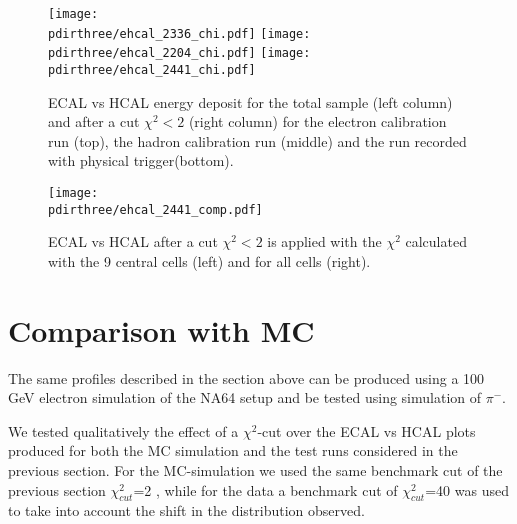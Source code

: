 \newpage
\begin{figure}[h!]
  \begin{center}
    \texttt{[image: \\pdirthree/ehcal\_2336\_chi.pdf]}
    \texttt{[image: \\pdirthree/ehcal\_2204\_chi.pdf]}
    \texttt{[image: \\pdirthree/ehcal\_2441\_chi.pdf]}
  \end{center}
  \caption[ECAL vs HCAL energy deposit after a cut $\chi^2$]{ECAL vs HCAL energy deposit for the total sample (left
    column) and after a cut $\chi^2<2$ (right column) for the
    electron calibration run (top), the hadron calibration run (middle) and the run recorded with physical trigger(bottom).}
  \label{fig:ehcal_test}
\end{figure}
\clearpage

\begin{figure}[h!]
  \begin{center}
    \texttt{[image: \\pdirthree/ehcal\_2441\_comp.pdf]}
  \end{center}
  \caption[ECAL vs HCAL energy deposit after a cut $\chi^2$ for different ECAL configurations]{ECAL vs HCAL after a cut $\chi^2<2$ is applied with the $\chi^2$ calculated with the 9 central cells (left) and for all cells (right).}
  \label{fig:ehcal_comp}
\end{figure}

\iffalse

\section{Comparison with MC}
\label{ch3:sec:mc}
The same profiles described in the section above can be produced using
a 100 GeV electron simulation of the NA64 setup\cite{na64-simulation} and be tested using simulation of $\pi^-$.

We tested qualitatively the effect of a $\chi^{2}$-cut over the
ECAL vs HCAL plots produced for both the MC simulation
and the test runs considered in the previous section. For the
MC-simulation we used the same benchmark cut of the previous section
$\chi^2_{cut}$=2 , while for the data a benchmark cut of
$\chi^2_{cut}$=40 was used to take into account the shift in the
distribution observed.

